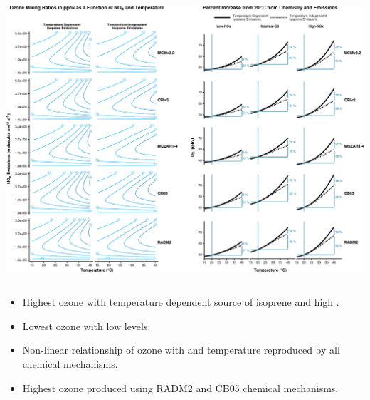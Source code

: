 \begin{GreyBox}
    \vskip-1cm
    \begin{block}{} 
        \begin{center}
            \includegraphics[width = \textwidth]{Plotting/results}
        \end{center}
        \begin{columns}[c]
                \begin{WhiteBox}
                    \begin{itemize} \vspace{2mm}
                        \item Highest ozone with temperature dependent source of isoprene and high . \vspace{5mm}
                        \item Lowest ozone with low  levels. \vspace{5mm}
                        \item Non-linear relationship of ozone with  and temperature reproduced by all chemical mechanisms. \vspace{5mm}
                        \item Highest ozone produced using RADM2 and CB05 chemical mechanisms. \vspace{5mm}
                    \end{itemize}
                \end{WhiteBox}
                \begin{WhiteBox} \vspace{2mm}

\end{WhiteBox}
\end{columns}
\end{block}
\end{GreyBox}
